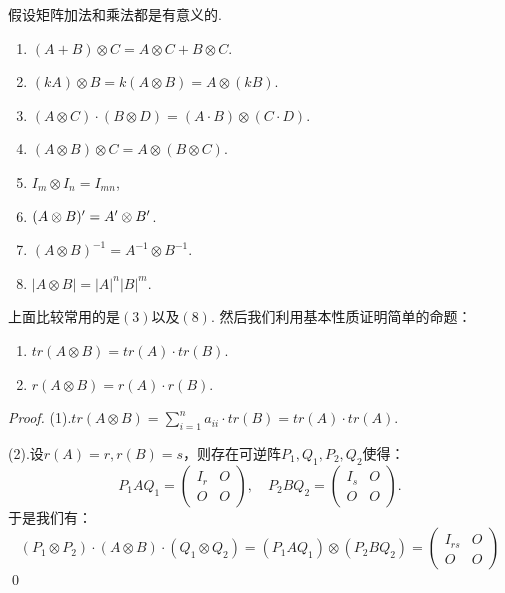 \begin{proposition}
	假设矩阵加法和乘法都是有意义的.
	\begin{enumerate}[(1)]
		\item $(A+B) \otimes C = A \otimes C + B \otimes C$.
		\item $(kA) \otimes B = k(A \otimes B) = A \otimes (kB)$.
		\item $(A \otimes C) \cdot (B \otimes D) = (A\cdot B) \otimes (C\cdot D)$.
		\item $(A \otimes B) \otimes C = A \otimes (B \otimes C)$.
		\item $I_m \otimes I_n = I_{mn}$,
		\item $(A \otimes B)^\prime = A^{\prime} \otimes B^{\prime}$.
		\item $(A \otimes B)^{-1} = A^{-1} \otimes B^{-1}$.
		\item $| A \otimes B | = |A|^n |B| ^m$.
	\end{enumerate}
\end{proposition}

上面比较常用的是$(3)$以及$(8)$. 然后我们利用基本性质证明简单的命题：
\begin{proposition}
	\begin{enumerate}[(1)]
		\item $tr(A \otimes B) = tr(A) \cdot tr(B)$.
		\item $r(A \otimes B) = r(A) \cdot r(B)$.
	\end{enumerate}
\end{proposition}

\begin{proof}
	(1).$tr(A \otimes B)= \sum \limits_{i=1}^n a_{ii} \cdot tr(B) = tr(A) \cdot tr(A)$.
	
	(2).设$r(A)=r,r(B)=s$，则存在可逆阵$P_1,Q_1,P_2,Q_2$使得：
	$$
		P_1 A Q_1 = \begin{pmatrix}
			I_r & O \\ O & O 
		\end{pmatrix}, \quad
		P_2 B Q_2 = \begin{pmatrix}
			I_s & O \\ O & O 
		\end{pmatrix}.
	$$
	于是我们有：
	$$
		(P_1 \otimes P_2) \cdot (A \otimes B) \cdot (Q_1 \otimes Q_2) = 
		(P_1 A Q_1) \otimes (P_2 B Q_2) = 
		\begin{pmatrix}
			I_{rs} & O \\ O & O
		\end{pmatrix}
	$$
	\qed{}
\end{proof}


